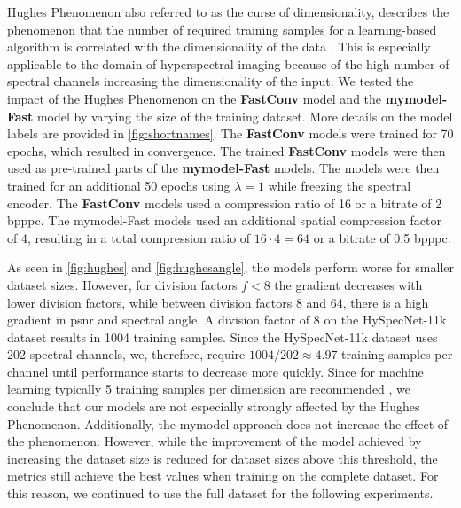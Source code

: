 Hughes Phenomenon also referred to as the curse of dimensionality, describes the phenomenon that the number of required training samples for a learning-based algorithm is correlated with the dimensionality of the data \citep{hughes_mean_1968}. This is especially applicable to the domain of hyperspectral imaging because of the high number of spectral channels increasing the dimensionality of the input. We tested the impact of the Hughes Phenomenon on the \textbf{FastConv} model and the \textbf{\ac{mymodel}-Fast} model by varying the size of the training dataset. More details on the model labels are provided in \autoref{fig:shortnames}. The \textbf{FastConv} models were trained for 70 epochs, which resulted in convergence.
The trained \textbf{FastConv} models were then used as pre-trained parts of the \textbf{\ac{mymodel}-Fast} models. The models were then trained for an additional 50 epochs using $\lambda=1$ while freezing the spectral encoder. 
The \textbf{FastConv} models used a compression ratio of 16 or a bitrate of 2 \ac{bpppc}. The \ac{mymodel}-Fast models used an additional spatial compression factor of 4, resulting in a total compression ratio of $16 \cdot 4=64$ or a bitrate of 0.5 \ac{bpppc}.

As seen in \autoref{fig:hughes} and \autoref{fig:hughesangle}, the models perform worse for smaller dataset sizes. However, for division factors $f < 8$ the gradient decreases with lower division factors, while between division factors 8 and 64, there is a high gradient in \ac{psnr} and spectral angle. A division factor of 8 on the HySpecNet-11k dataset results in 1004 training samples. Since the HySpecNet-11k dataset uses 202 spectral channels, we, therefore, require $1004/202 \approx 4.97$ training samples per channel until performance starts to decrease more quickly. Since for machine learning typically 5 training samples per dimension are recommended \citep{theodoridis_pattern_2009}, we conclude that our models are not especially strongly affected by the Hughes Phenomenon. Additionally, the \ac{mymodel} approach does not increase the effect of the phenomenon. However, while the improvement of the model achieved by increasing the dataset size is reduced for dataset sizes above this threshold, the metrics still achieve the best values when training on the complete dataset. For this reason, we continued to use the full dataset for the following experiments.
